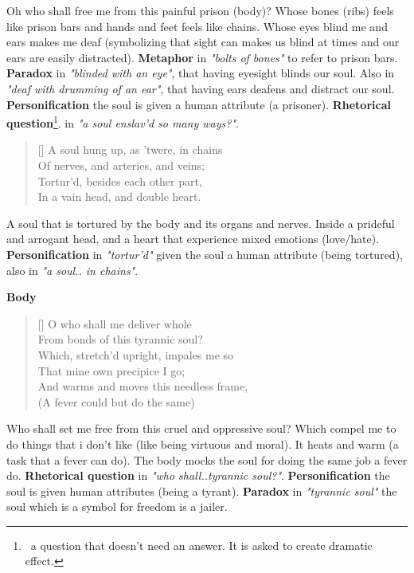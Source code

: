 \documentclass[12pt, a4paper]{article}
\begin{document}
Oh who shall free me from this painful prison (body)?
Whose bones (ribs) feels like prison bars and hands
and feet feels like chains. Whose eyes blind me 
and ears makes me deaf (symbolizing that sight can 
makes us blind at times and our ears are easily distracted). 
\textbf{Metaphor} in \textit{"bolts of bones"} to refer to prison bars. 
\textbf{Paradox} in \textit{"blinded with an eye"}, that
having eyesight blinds our soul. Also in \textit{"deaf with
drumming of an ear"}, that having ears deafens and distract our
soul. \textbf{Personification} the soul is given a human attribute
(a prisoner). \textbf{Rhetorical question}\footnote{\, 
a question that doesn't need an answer. It is asked to create dramatic effect.}.
 in \textit{"a soul enslav’d so many ways?"}. 

\begin{verse}[\versewidth]
{\fontverse
A soul hung up, as ’twere, in chains\\
Of nerves, and arteries, and veins;\\
Tortur’d, besides each other part,\\
In a vain head, and double heart. 
} 
\end{verse}

A soul that is tortured by the body and its organs and nerves.
Inside a prideful and arrogant head, and a heart that experience
mixed emotions (love/hate). \textbf{Personification} in \textit{"tortur'd"} 
given the soul a human attribute (being tortured), also in \textit{"a soul.. in chains"}.\bigbreak

\newpage
\centerline{\textbf{\large{Body}}}
\begin{verse}[\versewidth]
{\fontverse
O who shall me deliver whole\\
From bonds of this tyrannic soul?\\
Which, stretch’d upright, impales me so\\
That mine own precipice I go;\\
And warms and moves this needless frame,\\
(A fever could but do the same)
} 
\end{verse}

Who shall set me free from this cruel and oppressive soul? Which compel 
me to do things that i don't like (like being virtuous and moral). It 
heats and warm (a task that a fever can do). The body mocks the soul 
for doing the same job a fever do. \textbf{Rhetorical question} in
\textit{"who shall..tyrannic soul?"}. \textbf{Personification} the soul
is given human attributes (being a tyrant). \textbf{Paradox} in \textit{"tyrannic soul"}
the soul which is a symbol for freedom is a jailer.
\end{document}
